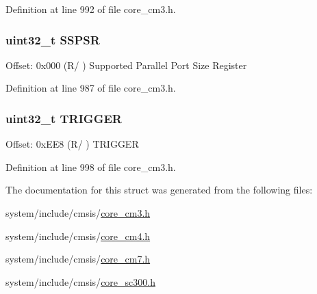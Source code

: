 Definition at line 992 of file core\+\_\+cm3.\+h.

\subsubsection[{\texorpdfstring{S\+S\+P\+SR}{SSPSR}}]{ uint32\+\_\+t S\+S\+P\+SR}\hypertarget{struct_t_p_i___type_a1aa8bba158b6ac122676301f17a362d9}{}\label{struct_t_p_i___type_a1aa8bba158b6ac122676301f17a362d9}
Offset\+: 0x000 (R/ ) Supported Parallel Port Size Register 

Definition at line 987 of file core\+\_\+cm3.\+h.

\subsubsection[{\texorpdfstring{T\+R\+I\+G\+G\+ER}{TRIGGER}}]{ uint32\+\_\+t T\+R\+I\+G\+G\+ER}\hypertarget{struct_t_p_i___type_a5590387d8f44b477fd69951a737b0d7e}{}\label{struct_t_p_i___type_a5590387d8f44b477fd69951a737b0d7e}
Offset\+: 0x\+E\+E8 (R/ ) T\+R\+I\+G\+G\+ER 

Definition at line 998 of file core\+\_\+cm3.\+h.



The documentation for this struct was generated from the following files\+:\begin{DoxyCompactItemize}
\item 
system/include/cmsis/\hyperlink{core__cm3_8h}{core\+\_\+cm3.\+h}\item 
system/include/cmsis/\hyperlink{core__cm4_8h}{core\+\_\+cm4.\+h}\item 
system/include/cmsis/\hyperlink{core__cm7_8h}{core\+\_\+cm7.\+h}\item 
system/include/cmsis/\hyperlink{core__sc300_8h}{core\+\_\+sc300.\+h}\end{DoxyCompactItemize}
